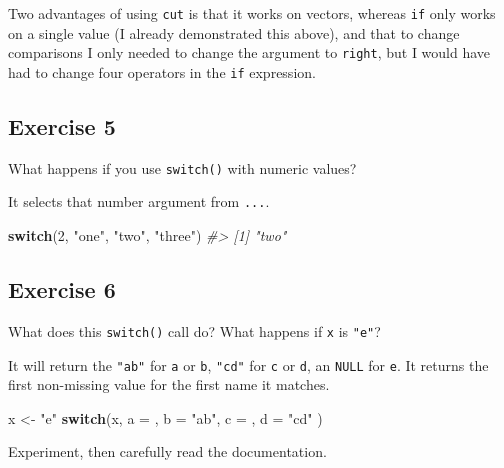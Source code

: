 \documentclass[]{book}
\newenvironment{Shaded}{\begin{snugshade}}{\end{snugshade}}
\newcommand{\CommentTok}[1]{\textcolor[rgb]{0.56,0.35,0.01}{\textit{#1}}}
\newcommand{\ControlFlowTok}[1]{\textcolor[rgb]{0.13,0.29,0.53}{\textbf{#1}}}
\newcommand{\DataTypeTok}[1]{\textcolor[rgb]{0.13,0.29,0.53}{#1}}
\newcommand{\DecValTok}[1]{\textcolor[rgb]{0.00,0.00,0.81}{#1}}
\newcommand{\NormalTok}[1]{#1}
\newcommand{\StringTok}[1]{\textcolor[rgb]{0.31,0.60,0.02}{#1}}
\theoremstyle{plain}
\theoremstyle{remark}
\theoremstyle{definition}
\theoremstyle{definition}
\theoremstyle{definition}
\theoremstyle{remark}
\begin{document}
Two advantages of using \texttt{cut} is that it works on vectors,
whereas \texttt{if} only works on a single value (I already demonstrated
this above), and that to change comparisons I only needed to change the
argument to \texttt{right}, but I would have had to change four
operators in the \texttt{if} expression.

\hypertarget{exercise-5-17}{%
\subsection{Exercise 5}\label{exercise-5-17}}

What happens if you use \texttt{switch()} with numeric values?

It selects that number argument from \texttt{...}.

\begin{Shaded}
\begin{Highlighting}[]
\ControlFlowTok{switch}\NormalTok{(}\DecValTok{2}\NormalTok{, }\StringTok{"one"}\NormalTok{, }\StringTok{"two"}\NormalTok{, }\StringTok{"three"}\NormalTok{)}
\CommentTok{#> [1] "two"}
\end{Highlighting}
\end{Shaded}

\hypertarget{exercise-6-12}{%
\subsection{Exercise 6}\label{exercise-6-12}}

What does this \texttt{switch()} call do? What happens if \texttt{x} is
\texttt{"e"}?

It will return the \texttt{"ab"} for \texttt{a} or \texttt{b},
\texttt{"cd"} for \texttt{c} or \texttt{d}, an \texttt{NULL} for
\texttt{e}. It returns the first non-missing value for the first name it
matches.

\begin{Shaded}
\begin{Highlighting}[]
\NormalTok{x <-}\StringTok{ "e"}
\ControlFlowTok{switch}\NormalTok{(x,}
  \DataTypeTok{a =}\NormalTok{ ,}
  \DataTypeTok{b =} \StringTok{"ab"}\NormalTok{,}
  \DataTypeTok{c =}\NormalTok{ ,}
  \DataTypeTok{d =} \StringTok{"cd"}
\NormalTok{)}
\end{Highlighting}
\end{Shaded}

Experiment, then carefully read the documentation.
\end{document}
